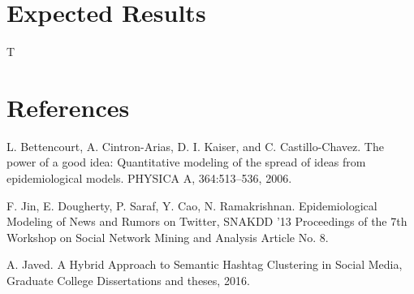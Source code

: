 \documentclass{article}
\begin{document}
\section{Expected Results}
T
\section{References}
\begin{enumerate}[label={[\arabic*]}]
\item  L. Bettencourt, A. Cintron-Arias, D. I. Kaiser, and C. Castillo-Chavez. The power of a good idea: Quantitative modeling of the spread of ideas from epidemiological models. PHYSICA A, 364:513–536, 2006.
\item F. Jin, E. Dougherty, P. Saraf, Y. Cao, N. Ramakrishnan. Epidemiological Modeling of News and Rumors on Twitter, SNAKDD '13 Proceedings of the 7th Workshop on Social Network Mining and Analysis
Article No. 8.
\item A. Javed. A Hybrid Approach to Semantic Hashtag Clustering in Social Media, Graduate College Dissertations and  theses, 2016.
\end{enumerate}
\end{document}
